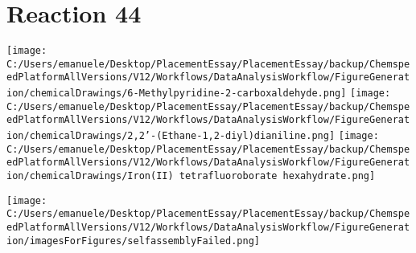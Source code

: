 \documentclass{article}%
\begin{document}
\section*{Reaction 44}%
%
\begin{scheme}[H]%
\begin{minipage}{0.5\textwidth}%
\texttt{[image: C:/Users/emanuele/Desktop/PlacementEssay/PlacementEssay/backup/ChemspeedPlatformAllVersions/V12/Workflows/DataAnalysisWorkflow/FigureGeneration/chemicalDrawings/6-Methylpyridine-2-carboxaldehyde.png]}%
\texttt{[image: C:/Users/emanuele/Desktop/PlacementEssay/PlacementEssay/backup/ChemspeedPlatformAllVersions/V12/Workflows/DataAnalysisWorkflow/FigureGeneration/chemicalDrawings/2,2'-(Ethane-1,2-diyl)dianiline.png]}%
\texttt{[image: C:/Users/emanuele/Desktop/PlacementEssay/PlacementEssay/backup/ChemspeedPlatformAllVersions/V12/Workflows/DataAnalysisWorkflow/FigureGeneration/chemicalDrawings/Iron(II) tetrafluoroborate hexahydrate.png]}%
\end{minipage}%
\begin{minipage}{0.5\textwidth}%
\begin{center}%
\texttt{[image: C:/Users/emanuele/Desktop/PlacementEssay/PlacementEssay/backup/ChemspeedPlatformAllVersions/V12/Workflows/DataAnalysisWorkflow/FigureGeneration/imagesForFigures/selfassemblyFailed.png]}%
\end{center}%
\end{minipage}%
\caption{Self-assembly of components 8, 20, with Iron(II) in a 3.0:1.5:1.0 molar ratio in CH$_3$CN at 60\textdegree C for 40h. These are the reagents (starting materials) for reaction 44.}%
\end{scheme}%
\end{document}
